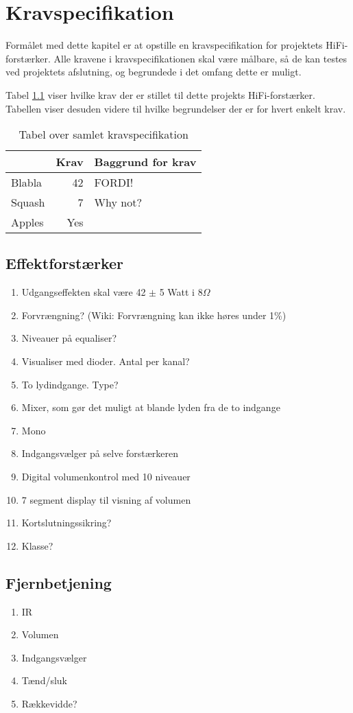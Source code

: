 \chapter{Kravspecifikation}
\label{kravspec}
Formålet med dette kapitel er at opstille en kravspecifikation for projektets HiFi-forstærker. Alle kravene i kravspecifikationen skal være målbare, så de kan testes ved projektets afslutning, og begrundede i det omfang dette er muligt. 

Tabel \ref{tab:kravspec} viser hvilke krav der er stillet til dette projekts HiFi-forstærker. Tabellen viser desuden videre til hvilke begrundelser der er for hvert enkelt krav.
\begin{table}[h]
\centering
\begin{tabular}{l|r|l}
\hline\hline
 & Krav & Baggrund for krav \\
\hline\hline
Blabla & 42 & FORDI! \\
Squash & 7 & Why not? \\
\hline
Apples & Yes & \\
\hline\hline
\end{tabular}
\caption{Tabel over samlet kravspecifikation}
\label{tab:kravspec}
\end{table}
\section*{Effektforstærker}
\begin{enumerate}
\item Udgangseffekten skal være 42 $\pm$ 5 Watt i 8$\Omega$
\item Forvrængning? (Wiki: Forvrængning kan ikke høres under 1\%)
\item Niveauer på equaliser?
\item Visualiser med dioder. Antal per kanal?
\item To lydindgange. Type?
\item Mixer, som gør det muligt at blande lyden fra de to indgange
\item Mono
\item Indgangsvælger på selve forstærkeren
\item Digital volumenkontrol med 10 niveauer
\item 7 segment display til visning af volumen
\item Kortslutningssikring?
\item Klasse?
\end{enumerate}

\section*{Fjernbetjening}
\begin{enumerate}
\item IR
\item Volumen
\item Indgangsvælger
\item Tænd/sluk
\item Rækkevidde?
\end{enumerate}